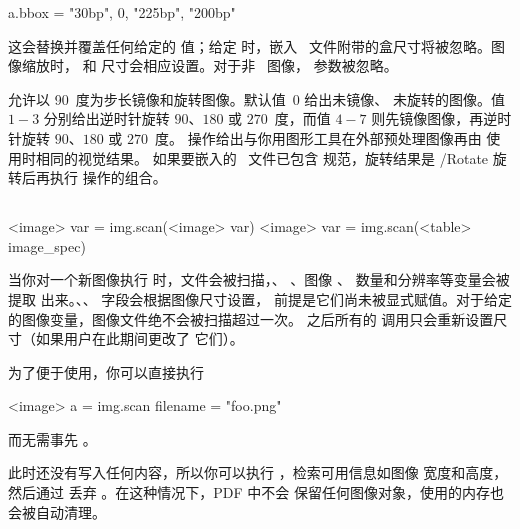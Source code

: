 \begin{typing}
a.bbox = { "30bp", 0, "225bp", "200bp" }
\end{typing}

这会替换并覆盖任何给定的  值；给定  时，嵌入
\PDF\ 文件附带的盒尺寸将被忽略。图像缩放时， 和 
尺寸会相应设置。对于非 \PDF\ 图像， 参数被忽略。

 允许以 90~度为步长镜像和旋转图像。默认值~$0$ 给出未镜像、
未旋转的图像。值 $1-3$ 分别给出逆时针旋转 $90$、$180$ 或 $270$~度，而值
$4-7$ 则先镜像图像，再逆时针旋转 $90$、$180$ 或 $270$~度。
操作给出与你用图形工具在外部预处理图像再由 \LUATEX 使用时相同的视觉结果。
如果要嵌入的 \PDF\ 文件已包含  规范，旋转结果是 \type
{/Rotate} 旋转后再执行  操作的组合。

\subsection{}


\begin{typing}
<image> var = img.scan(<image> var)
<image> var = img.scan(<table> image_spec)
\end{typing}

当你对一个新图像执行  时，文件会被扫描，、
、图像 、 数量和分辨率等变量会被提取
出来。、、 字段会根据图像尺寸设置，
前提是它们尚未被显式赋值。对于给定的图像变量，图像文件绝不会被扫描超过一次。
之后所有的  调用只会重新设置尺寸（如果用户在此期间更改了
它们）。

为了便于使用，你可以直接执行

\begin{typing}
<image> a = img.scan { filename = "foo.png" }
\end{typing}

而无需事先 。

此时还没有写入任何内容，所以你可以执行 ，检索可用信息如图像
宽度和高度，然后通过  丢弃 。在这种情况下，PDF 中不会
保留任何图像对象，使用的内存也会被自动清理。

\subsection{}


